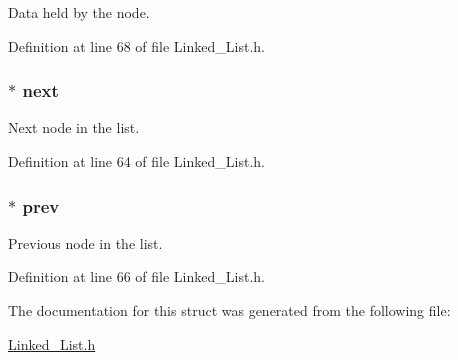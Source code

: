 Data held by the node. 



Definition at line 68 of file Linked\+\_\+\+List.\+h.

\hypertarget{struct_node__t_a249ab672b08b852bbcf27a16e05dacf5}{}
\subsubsection[{next}]{$\ast$ next}\label{struct_node__t_a249ab672b08b852bbcf27a16e05dacf5}


Next node in the list. 



Definition at line 64 of file Linked\+\_\+\+List.\+h.

\hypertarget{struct_node__t_a05135d5188af738ba91fcf12461b0efb}{}
\subsubsection[{prev}]{$\ast$ prev}\label{struct_node__t_a05135d5188af738ba91fcf12461b0efb}


Previous node in the list. 



Definition at line 66 of file Linked\+\_\+\+List.\+h.



The documentation for this struct was generated from the following file\+:\begin{DoxyCompactItemize}
\item 
\hyperlink{_linked___list_8h}{Linked\+\_\+\+List.\+h}\end{DoxyCompactItemize}
